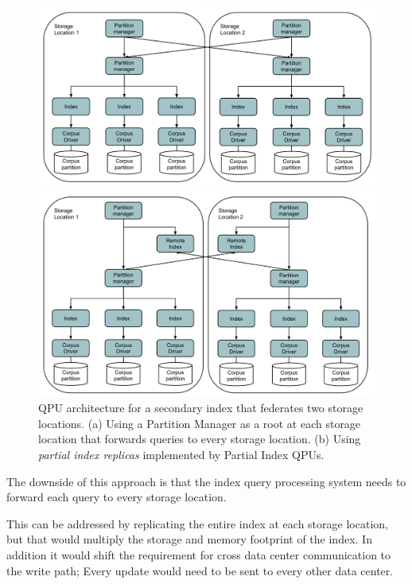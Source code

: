 \begin{figure}
  \begin{minipage}{.5\textwidth}
    \centering
    \includegraphics[scale=0.24]{./figures/case_studies/federated_index.pdf}
  \end{minipage}%
  \begin{minipage}{.5\textwidth}
    \centering
    \includegraphics[scale=0.24]{./figures/case_studies/federated_index_remote.pdf}
  \end{minipage}
  \caption{QPU architecture for a secondary index that federates two storage locations.
  (a) Using a Partition Manager as a root at each storage location that forwards queries to every storage location.
  (b) Using \textit{partial index replicas} implemented by Partial Index QPUs.}
  \label{fig:federated_index}
\end{figure}

The downside of this approach is that the index query processing system needs to forward each query to every
storage location.

This can be addressed by replicating the entire index at each storage location,
but that would multiply the storage and memory footprint of the index.
In addition it would shift the requirement for cross data center communication to the write path;
Every update would need to be sent to every other data center.

